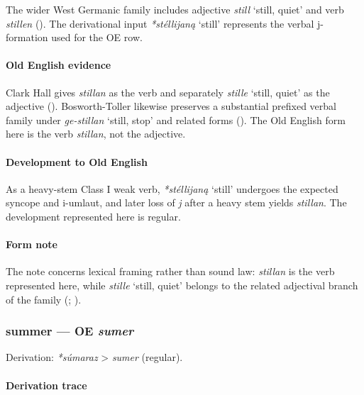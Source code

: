 \documentclass[
  british,
  a4paper,
]{article}
\providecommand{\Recon}[1]{\emph{*#1}}
\begin{document}
The wider West Germanic family includes adjective {\emph{still}} `still,
quiet' and verb \emph{stillen} (). The derivational input \Recon{stéllijaną} `still' represents the
verbal j-formation used for the OE row.

\paragraph{Old English evidence}\label{old-english-evidence-60}

Clark Hall gives \emph{stillan} as the verb and separately
{\emph{stille}} `still, quiet' as the adjective
(). Bosworth-Toller
likewise preserves a substantial prefixed verbal family under
\emph{ge-stillan} `still, stop' and related forms
(). The
Old English form here is the verb \emph{stillan}, not the adjective.

\paragraph{Development to Old
English}\label{development-to-old-english-59}

As a heavy-stem Class I weak verb, \Recon{stéllijaną} `still' undergoes
the expected syncope and i-umlaut, and later loss of \emph{j} after a
heavy stem yields \emph{stillan}. The development represented here is
regular.

\paragraph{Form note}\label{form-note-19}

The note concerns lexical framing rather than sound law: \emph{stillan}
is the verb represented here, while {\emph{stille}} `still, quiet'
belongs to the related adjectival branch of the family
(;
).

\subsubsection{\texorpdfstring{summer --- OE
\emph{sumer}}{summer --- OE sumer}}\label{summer-oe-sumer}

Derivation: \emph{*súmaraz} \textgreater{} \emph{sumer} (regular).

\paragraph{Derivation trace}\label{derivation-trace-78}
\end{document}
